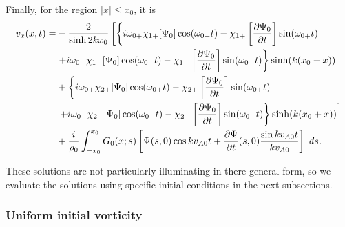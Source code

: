 Finally, for the region $|x| \leq x_0$, it is
\begin{align}
v_x(x, t) =& -\frac{2}{\sinh{2kx_0}} \left[ \left\{ i\omega_{0+}\chi_{1+}[\Psi_0] \cos(\omega_{0+} t) - \chi_{1+}\left[ \frac{\partial \Psi_0}{\partial t} \right] \sin(\omega_{0+} t) \right. \right. \notag \\
& \left. + i\omega_{0-}\chi_{1-}[\Psi_0] \cos(\omega_{0-} t) - \chi_{1-}\left[ \frac{\partial \Psi_0}{\partial t} \right] \sin(\omega_{0-} t) \right\} \sinh(k(x_0 - x)) \notag \\ 
& + \left\{ i\omega_{0+}\chi_{2+}[\Psi_0] \cos(\omega_{0+} t) - \chi_{2+}\left[ \frac{\partial \Psi_0}{\partial t} \right] \sin(\omega_{0+} t) \right. \notag \\
& \left. \left. + i\omega_{0-}\chi_{2-}[\Psi_0] \cos(\omega_{0-} t) - \chi_{2-}\left[ \frac{\partial \Psi_0}{\partial t} \right] \sin(\omega_{0-} t) \right\} \sinh(k(x_0 + x)) \right] \notag \\
& + \frac{i}{\rho_0} \int_{-x_0}^{x_0} G_0(x;s) \left[ \Psi(s, 0) \cos{kv_{A0}t} + \frac{\partial \Psi}{\partial t}(s, 0) \frac{\sin{kv_{A0}t}}{kv_{A0}} \right]~ds.
\end{align}

These solutions are not particularly illuminating in there general form, so we evaluate the solutions using specific initial conditions in the next subsections.


\subsubsection{Uniform initial vorticity}

